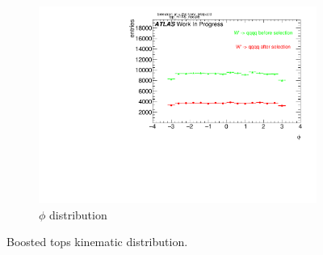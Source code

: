 \begin{figure}
\begin{subfigure}[b]{0.45\textwidth}
        \includegraphics[width=\textwidth]{jet_part/appendixA/tops/1cfrt_h_FatJet_psi.pdf}
        \caption{$\phi$ distribution}
        \label{fig:mouse}
    \end{subfigure}
    \caption{Boosted tops kinematic distribution.}\label{fig:animals}
\end{figure}


